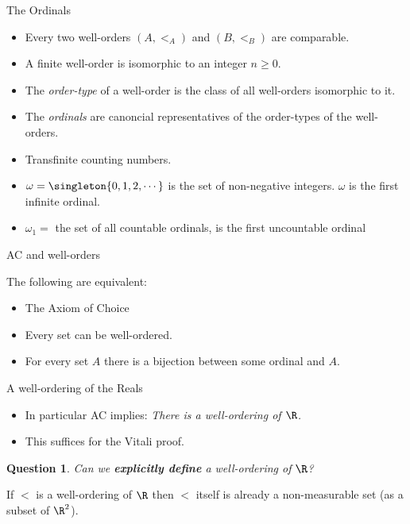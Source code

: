 \documentclass{beamer}
\newtheorem*{question}{Question}
\begin{document}
\begin{frame}{The Ordinals}

\begin{itemize}
  \item  Every two well-orders $(A, <_A)$ and $(B, <_B)$ are comparable.
  \item  A finite well-order is isomorphic to an integer $n\geq 0$.
  \item The \emph{order-type} of a well-order is the class of all well-orders
  isomorphic to it.
  \item The \emph{ordinals} are canoncial representatives of the
    order-types of the well-orders.
  \item Transfinite counting numbers.
  \item $\omega = \singleton{0, 1, 2, \cdots }$ is the set of non-negative
    integers. $\omega$ is the first infinite ordinal.
  \item  $\omega_1 = $ the set of all countable ordinals, is the first
    uncountable ordinal
\end{itemize}

\end{frame}

\begin{frame}{AC and well-orders}

The following are equivalent:
\begin{itemize}
  \item  The Axiom of Choice
  \item  Every set can be well-ordered.
  \item For every set $A$ there is a bijection between some ordinal and $A$.
\end{itemize}

\end{frame}

\begin{frame}{A well-ordering of the Reals}

\begin{itemize}
  \item  In particular AC implies: \emph{There is a well-ordering of $\R$.}
  \item  This suffices for the Vitali proof.
\end{itemize}

\begin{question}
Can we \textbf{explicitly define} a well-ordering of $\R$?
\end{question}

\begin{fact}
If $<$ is a well-ordering of $\R$ then $<$ itself is
already a non-measurable set (as a subset of $\R^2$).
\end{fact}

\end{frame}
\end{document}
